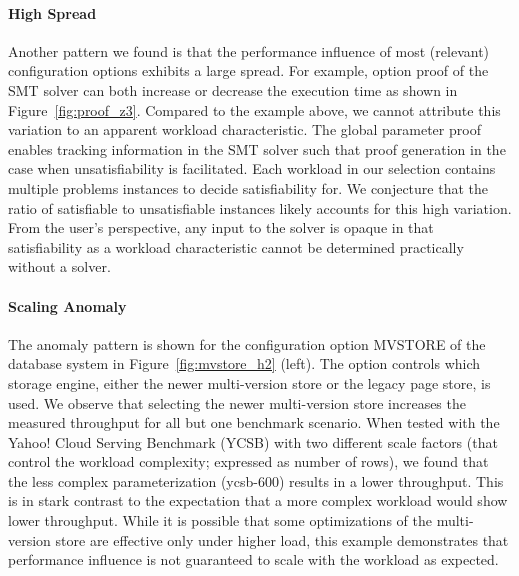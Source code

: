 {{{\paragraph{High Spread} Another pattern we found is that the performance influence of most (relevant) configuration options exhibits a large spread. For example, option \textsf{proof} of the SMT solver \zdrei can both increase or decrease the execution time as shown in Figure~\ref{fig:proof_z3}. Compared to the example above, we cannot attribute this variation to an apparent workload characteristic.
The global parameter \textsf{proof} enables tracking information in the SMT solver such that proof generation in the case when unsatisfiability is facilitated. Each workload in our selection contains multiple problems instances to decide satisfiability for. We conjecture that the ratio of satisfiable to unsatisfiable instances likely accounts for this high variation. From the user's perspective, any input to the solver is opaque in that satisfiability as a workload characteristic cannot be determined practically without a solver. 

\paragraph{Scaling Anomaly} The anomaly pattern is shown for the configuration option \textsf{MVSTORE} of the database system \htwo in Figure~\ref{fig:mvstore_h2} (left). The option controls which storage engine, either the newer multi-version store or the legacy page store, is used. We observe that selecting the newer multi-version store increases the measured throughput for all but one benchmark scenario. When tested with the Yahoo! Cloud Serving Benchmark (YCSB) with two different scale factors (that control the workload complexity; expressed as number of rows), we found that the less complex parameterization (ycsb-600) results in a lower throughput. This is in stark contrast to the expectation that a more complex workload would show lower throughput. While it is possible that some optimizations of the multi-version store are effective only under higher load, this example demonstrates that performance influence is not guaranteed to scale with the workload as expected.  

\vspace{1mm}

}}}
